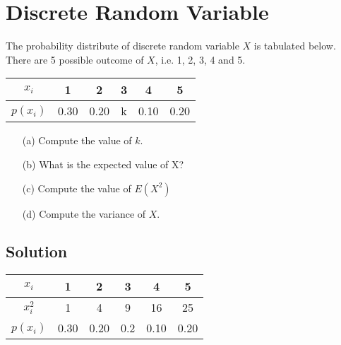 \documentclass[a4paper,12pt]{article}
\begin{document}
\Large 
\section*{Discrete Random Variable}
The probability distribute of discrete random variable $X$ is tabulated below. There are 5 possible outcome of $X$, i.e. 1, 2, 3, 4 and 5.
\begin{center}
\begin{tabular}{|c||c|c|c|c|c|}
\hline
\phantom{sp} $x_i$  \phantom{sp} & \phantom{sp}1 \phantom{sp} & \phantom{sp}2 \phantom{sp} & \phantom{sp}3 \phantom{sp} & \phantom{sp}4 \phantom{sp} & \phantom{sp}5 \phantom{sp} \\\hline
$p(x_i)$ & 0.30 & 0.20 & k & 0.10 & 0.20 \\
\hline
\end{tabular}
\end{center}
\medskip
\begin{itemize}
\item[(a)] Compute the value of $k$.
\item[(b)] What is the expected value of X?
\item[(c)] Compute the value of $E(X^2)$
\item[(d)] Compute the variance of $X$.
\end{itemize}

\newpage

\subsection*{Solution}

\begin{center}
\begin{tabular}{|c||c|c|c|c|c|}
\hline
\phantom{sp}$x_i$ \phantom{sp} & \phantom{sp}1 \phantom{sp} & \phantom{sp}2 \phantom{sp} & \phantom{sp}3 \phantom{sp} & \phantom{sp}4 \phantom{sp} & \phantom{sp}5 \phantom{sp} \\\hline
$x^2_i$  & 1 & 4 & 9 & 16 & 25  \\\hline
$p(x_i)$ & 0.30 & 0.20 & 0.2 & 0.10 & 0.20 \\
\hline
\end{tabular}
\end{center}
\end{document}
